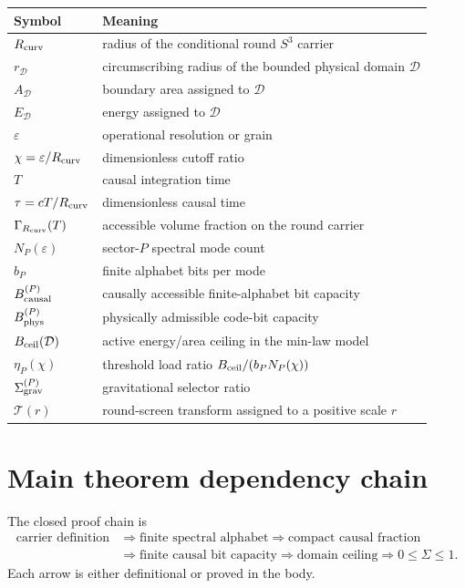 \documentclass[11pt,a4paper]{article}
\begin{document}
\begin{center}
\begin{tabular}{ll}
\toprule
Symbol & Meaning\\
\midrule
$R_{\rm curv}$ & radius of the conditional round $S^3$ carrier\\
$r_{\mathcal D}$ & circumscribing radius of the bounded physical domain $\mathcal D$\\
$A_{\mathcal D}$ & boundary area assigned to $\mathcal D$\\
$E_{\mathcal D}$ & energy assigned to $\mathcal D$\\
$\varepsilon$ & operational resolution or grain\\
$\chi=\varepsilon/R_{\rm curv}$ & dimensionless cutoff ratio\\
$T$ & causal integration time\\
$\tau=cT/R_{\rm curv}$ & dimensionless causal time\\
$\Gamma_{R_{\rm curv}}(T)$ & accessible volume fraction on the round carrier\\
$N_P(\varepsilon)$ & sector-$P$ spectral mode count\\
$b_P$ & finite alphabet bits per mode\\
$B_{\rm causal}^{(P)}$ & causally accessible finite-alphabet bit capacity\\
$B_{\rm phys}^{(P)}$ & physically admissible code-bit capacity\\
$B_{\rm ceil}(\mathcal D)$ & active energy/area ceiling in the min-law model\\
$\eta_P(\chi)$ & threshold load ratio \(B_{\rm ceil}/(b_PN_P(\chi))\)\\
$\Sigma_{\rm grav}^{(P)}$ & gravitational selector ratio\\
$\mathcal T(r)$ & round-screen transform assigned to a positive scale $r$\\
\bottomrule
\end{tabular}
\end{center}

\section{Main theorem dependency chain}
\label{sec:main-dependency-chain}

The closed proof chain is
\[
\begin{aligned}
\text{carrier definition}
&\Rightarrow \text{finite spectral alphabet}
 \Rightarrow \text{compact causal fraction}\\
&\Rightarrow \text{finite causal bit capacity}
 \Rightarrow \text{domain ceiling}
 \Rightarrow 0\le\Sigma\le1.
\end{aligned}
\]
Each arrow is either definitional or proved in the body.
\end{document}
